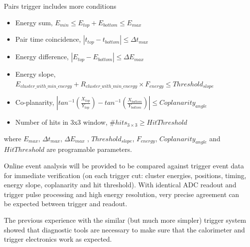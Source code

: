 Pairs trigger includes more conditions
\begin{itemize}
\item Energy sum,  
$E_{min}\le E_{top}+E_{bottom}\le E_{max}$
\item Pair time coincidence, 
$|t_{top}-t_{bottom}|\le \Delta t_{max}$ 
\item Energy difference, 
$|E_{top}-E_{bottom}|\le \Delta E_{max}$ 
\item Energy slope,
$E_{cluster\_with\_min\_energy}+R_{cluster\_with\_min\_energy}\times F_{energy}\le Threshold_{slope}$
\item Co-planarity, 
$|
tan^{-1}(\frac{X_{top}}{Y_{top}})-
tan^{-1}(\frac{X_{bottom}}{Y_{bottom}}) |\le Coplanarity_{angle}$
\item Number of hits in 3x3 window, 
\#$hits_{3\times 3}\ge HitThreshold$
\end{itemize}
\noindent
where $ E_{max}$,  $\Delta t_{max}$, $ \Delta E_{max}$ , $Threshold_{slope}$, 
$F_{energy}$, $Coplanarity_{angle}$
and
$HitThreshold$ are programable parameters.


Online event analysis will be provided to be compared against trigger event data for immediate verification (on each trigger cut: cluster energies, positions, timing, energy slope, coplanarity and hit threshold). With identical ADC readout and trigger pulse processing and high energy resolution, very precise agreement can be expected between trigger and readout.






The previous experience with the similar (but much more simpler) trigger system showed that diagnostic tools are necessary to make sure that the calorimeter and trigger electronics work as expected. 


